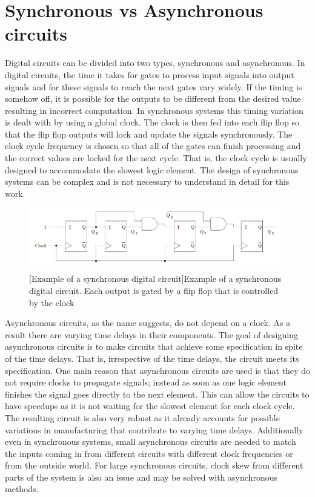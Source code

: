 \documentclass[12pt]{report}
\begin{document}
\section{Synchronous vs Asynchronous circuits}
Digital circuits can be divided into two types, synchronous and asynchronous.  In digital circuits, the time it takes for gates to process input signals into output signals and for these signals to reach the next gates vary widely.  If the timing is somehow off, it is possible for the outputs to be different from the desired value resulting in incorrect computation. In synchronous systems this timing variation is dealt with by using a global clock.  The clock is then fed into each flip flop so that the flip flop outputs will lock and update the signals synchronously. The clock cycle frequency is chosen so that all of the gates can finish processing and the correct values are locked for the next cycle. That is, the clock cycle is usually designed to accommodate the slowest logic element. The design of synchronous systems can be complex and is not necessary to understand in detail for this work. \\
\begin{figure}
\includegraphics[width=\textwidth]{syncex}
[Example of a synchronous digital circuit]{Example of a synchronous digital circuit.  Each output is gated by a flip flop that is controlled by the clock}
\end{figure}

Asynchronous circuits, as the name suggests, do not depend on a clock. As a result there are varying time delays in their components. The goal of designing asynchronous circuits is to make circuits that achieve some specification in spite of the time delays. That is, irrespective of the time delays, the circuit meets its specification. One main reason that asynchronous circuits are used is that they do not require clocks to propagate signals; instead as soon as one logic element finishes the signal goes directly to the next element.  This can allow the circuits to have speedups as it is not waiting for the slowest element for each clock cycle.  The resulting circuit is also very robust as it already accounts for possible variations in manufacturing that contribute to varying time delays.  Additionally even in synchronous systems, small asynchronous circuits are needed to match the inputs coming in from different circuits with different clock frequencies or from the outside world.  For large synchronous circuits, clock skew from different parts of the system is also an issue and may be solved with asynchronous methods. \\ %
\end{document}
